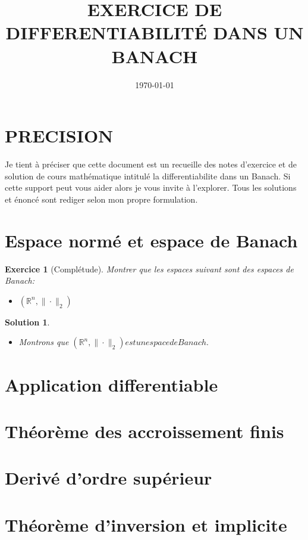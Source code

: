 \documentclass[12pt, a4paper, french]{article}
\title{EXERCICE DE DIFFERENTIABILITÉ DANS UN BANACH}
\date{\today}
\author{}
\theoremstyle{break}
\newtheorem{exo}{Exercice}[section]
\newtheorem{sol}{Solution}[section]
\begin{document}
\section*{PRECISION}
Je tient à préciser que cette document est un recueille des notes d'exercice et de solution de cours mathématique intitulé la differentiabilite dans un Banach. Si cette support peut vous aider alors je vous invite à l'explorer. Tous les solutions et énoncé sont rediger selon mon propre formulation.

\section{Espace normé et espace de Banach}
\begin{exo}[Complétude]
       Montrer que les espaces suivant sont des espaces de Banach:
       \begin{itemize}
              \item[a)] $(\mathbb{R}^{n}, \| \cdot \|_{2})$
       \end{itemize}
\end{exo}

\begin{sol}
       \begin{itemize}
              \item[a)] Montrons que $(\mathbb{R}^{n}, \| \cdot \|_{2}) est un espace de Banach.$\\
              
       \end{itemize}
\end{sol}
\section{Application differentiable}


\section{Théorème des accroissement finis}


\section{Derivé d'ordre supérieur}


\section{Théorème d'inversion et implicite}
\end{document}
